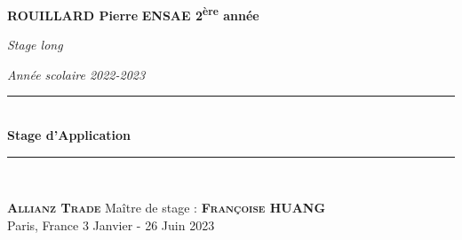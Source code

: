 \newcommand{\HRule}{\rule{\linewidth}{0.5mm}}

\begin{titlepage}
\begin{center}

\begin{minipage}{1\textwidth}
\Large{\textbf{ROUILLARD Pierre}} 
\hfill
\large{\textbf{ENSAE 2\textsuperscript{ère} année}}\par
\vspace{0cm}
\hfill \normalsize{\textit{Stage long}}\par
\hfill \normalsize{\textit{Année scolaire 2022-2023}}  
\end{minipage}

\vspace{8cm}

\begin{center}

\HRule \\[1cm]
{\huge \bfseries{Stage d'Application}}\\[0.5cm]
\HRule \\[2.5cm]

\end{center}

\vfill

\begin{minipage}{1\textwidth}
\begin{flushleft}
\large{\textbf{\textsc{Allianz Trade}}} \hfill \small{Maître de stage :} \large{\textbf{\textsc{Françoise HUANG}}} \\ 
\small{Paris, France} \hfill \small{3 Janvier - 26 Juin 2023}
\end{flushleft}
\end{minipage}

\end{center}
\end{titlepage}